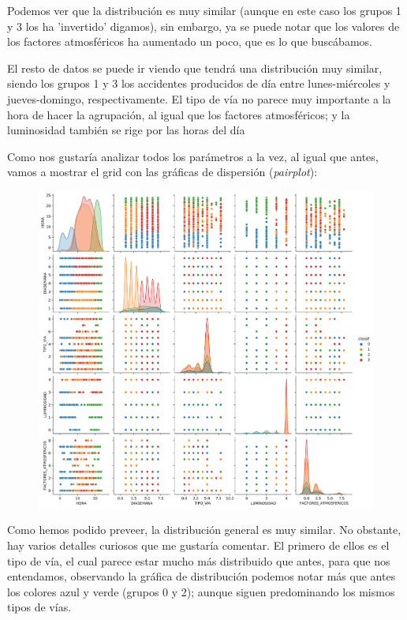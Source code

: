 \documentclass[11pt,a4paper]{article}
\begin{document}
Podemos ver que la distribución es muy similar (aunque en este caso los grupos 1 y 3 los ha 'invertido' digamos), sin embargo, ya
se puede notar que los valores de los factores atmosféricos ha aumentado un poco, que es lo que buscábamos.

El resto de datos se puede ir viendo que tendrá una distribución muy similar, siendo los grupos 1 y 3 los accidentes producidos
de día entre lunes-miércoles y jueves-domingo, respectivamente. El tipo de vía no parece muy importante a la hora de hacer la
agrupación, al igual que los factores atmosféricos; y la luminosidad también se rige por las horas del día

Como  nos gustaría analizar todos los parámetros a la vez, al igual que antes, vamos a mostrar el grid con las gráficas de dispersión
(\textit{pairplot}):

\begin{figure}[H]
    \centering
    \includegraphics[scale=0.3]{img/pairplot-gal.png}
\end{figure}

Como hemos podido preveer, la distribución general es muy similar. No obstante, hay varios detalles curiosos que me gustaría comentar.
El primero de ellos es el tipo de vía, el cual parece estar mucho más distribuido que antes, para que nos entendamos, observando la
gráfica de distribución podemos notar más que antes los colores azul y verde (grupos 0 y 2); aunque siguen predominando los mismos
tipos de vías.
\end{document}
